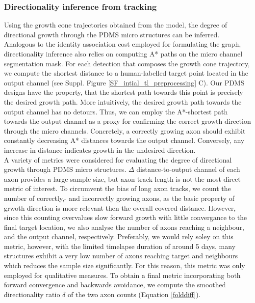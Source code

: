 \subsubsection{Directionality inference from tracking}
\label{inferring_directionality}
Using the growth cone trajectories obtained from the model, the degree of
directional growth through the PDMS micro structures can be inferred. Analogous
to the identity association cost employed for formulating the graph,
directionality inference also relies on computing A* paths on the micro channel
segmentation mask. For each detection that composes the growth cone trajectory,
we compute the shortest distance to a human-labelled target point located in the
output channel (see Suppl. Figure \ref{SF_intial_tl_preprocessing} C). Our PDMS
designs have the property, that the shortest path towards this point is
precisely the desired growth path. More intuitively, the desired growth path
towards the output channel has no detours. Thus, we can employ the A*-shortest
path towards the output channel as a proxy for confirming the correct growth
direction through the micro channels. Concretely, a correctly growing axon
should exhibit constantly decreasing A* distances towards the output channel.
Conversely, any increase in distance indicates growth in the undesired
direction. \\

A variety of metrics were considered for evaluating the degree of directional
growth through PDMS micro structures. $\Delta$ distance-to-output channel of
each axon provides a large sample size, but axon track length is not the most
direct metric of interest. To circumvent the bias of long axon tracks, we count
the number of correctly,- and incorrectly growing axons, as the basic property
of grwoth direction is more relevant then the overall covered distance. However,
since this counting overvalues slow forward growth with little convergance to
the final target location, we also analyse the number of axons reaching a
neighbour, and the output channel, respectively. Preferably, we would rely soley
on this metric, however, with the limited timelapse duration of around 5 days,
many structures exhibit a very low number of axons reaching target and
neighbours which reduces the sample size significantly. For this reason, this
metric was only employed for qualitative measures. To obtain a final metric
incorporating both forward convergence and backwards avoidance, we compute the
smoothed directionality ratio $\delta $ of the two axon counts (Equation
\ref{folddiff}).

